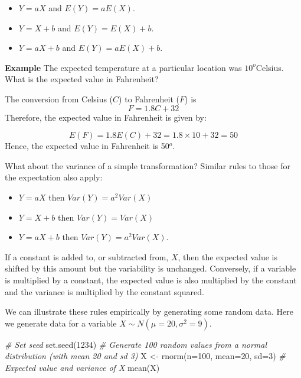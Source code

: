 \documentclass[
  oneside]{krantz}
\newenvironment{Shaded}{\begin{snugshade}}{\end{snugshade}}
\newcommand{\AttributeTok}[1]{\textcolor[rgb]{0.77,0.63,0.00}{#1}}
\newcommand{\CommentTok}[1]{\textcolor[rgb]{0.56,0.35,0.01}{\textit{#1}}}
\newcommand{\DecValTok}[1]{\textcolor[rgb]{0.00,0.00,0.81}{#1}}
\newcommand{\FunctionTok}[1]{\textcolor[rgb]{0.00,0.00,0.00}{#1}}
\newcommand{\NormalTok}[1]{#1}
\newcommand{\OtherTok}[1]{\textcolor[rgb]{0.56,0.35,0.01}{#1}}
\begin{document}
\begin{itemize}
\item
  \(Y = aX\) and \(E(Y) = aE(X)\).
\item
  \(Y = X + b\) and \(E(Y) = E(X) + b\).
\item
  \(Y = aX + b\) and \(E(Y)= aE(X) + b\).
\end{itemize}

\textbf{Example} The expected temperature at a particular location was \(10^o\)Celsius. What is the expected value in Fahrenheit?

The conversion from Celsius (\(C\)) to Fahrenheit (\(F\)) is
\[ F = 1.8C + 32\]
Therefore, the expected value in Fahrenheit is given by:

\[E(F) = 1.8E(C) + 32 = 1.8 \times 10 + 32 = 50\]
Hence, the expected value in Fahrenheit is 50\(^o\).

What about the variance of a simple transformation? Similar rules to those for the expectation also apply:

\begin{itemize}
\item
  \(Y = aX\) then \(Var(Y)= a^2Var(X)\)
\item
  \(Y = X + b\) then \(Var(Y)= Var(X)\)
\item
  \(Y = aX + b\) then \(Var(Y)= a^2Var(X)\).
\end{itemize}

If a constant is added to, or subtracted from, \(X\), then the expected value is shifted by this amount but the variability is unchanged. Conversely, if a variable is multiplied by a constant, the expected value is also multiplied by the constant and the variance is multiplied by the constant squared.

We can illustrate these rules empirically by generating some random data. Here we generate data for a variable \(X \sim N(\mu=20, \sigma^2=9)\).

\begin{Shaded}
\begin{Highlighting}[]
\CommentTok{\# Set seed}
\FunctionTok{set.seed}\NormalTok{(}\DecValTok{1234}\NormalTok{)}
\CommentTok{\# Generate 100 random values from a normal distribution (with mean 20 and sd 3)}
\NormalTok{X }\OtherTok{\textless{}{-}} \FunctionTok{rnorm}\NormalTok{(}\AttributeTok{n=}\DecValTok{100}\NormalTok{, }\AttributeTok{mean=}\DecValTok{20}\NormalTok{, }\AttributeTok{sd=}\DecValTok{3}\NormalTok{)}
\CommentTok{\# Expected value and variance of X}
\FunctionTok{mean}\NormalTok{(X)}
\end{Highlighting}
\end{Shaded}
\end{document}
